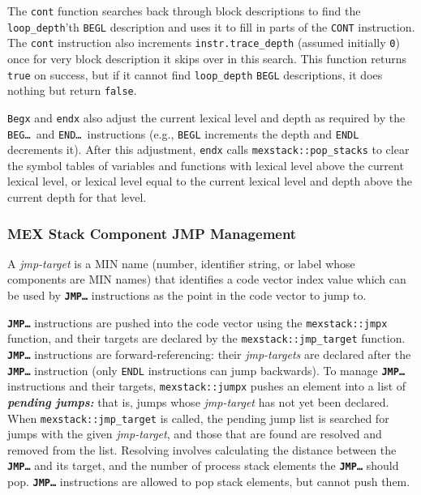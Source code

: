 \documentclass[12pt]{article}
\newcommand{\TT}[1]{{\tt \bfseries #1}}
\newcommand{\skey}[2]{{\bf \em #1#2}\index{#1}}
\newenvironment{indpar}[1][0.3in]%
	{\begin{list}{}%
		     {\setlength{\itemsep}{0in}%
		      \setlength{\topsep}{0in}%
		      \setlength{\parsep}{1ex}%
		      \setlength{\labelwidth}{#1}%
		      \setlength{\leftmargin}{#1}%
		      \addtolength{\leftmargin}{\labelsep}}%
	 \item}%
	{\end{list}}
\begin{document}
\begin{indpar}
The {\tt cont} function searches back through block descriptions to find
the {\tt loop\_depth}'th {\tt BEGL} description and uses it
to fill in parts of the {\tt CONT} instruction.  The {\tt cont} instruction
also increments {\tt instr.trace\_depth} (assumed initially {\tt 0})
once for very block description
it skips over in this search.  This function returns {\tt true} on success,
but if it cannot find {\tt loop\_depth} {\tt BEGL} descriptions, it does
nothing but return {\tt false}.

{\tt Begx} and {\tt endx} also adjust the current lexical level and
depth as required by the {\tt BEG\ldots}~and {\tt END\ldots}~instructions
(e.g., {\tt BEGL} increments the depth and {\tt ENDL} decrements it).
After this adjustment, {\tt endx} calls {\tt mexstack::pop\_stacks}
to clear the symbol tables of variables and functions with
lexical level above the current lexical level, or lexical level
equal to the current lexical level and depth above the current depth
for that level.
\end{indpar}


\subsubsection{MEX Stack Component JMP Management}
\label{MEX-STACK-COMPONENT-JMP-MANAGEMENT}

A {\em jmp-target} is a MIN name (number, identifier string, or
label whose components are MIN names) that identifies
a code vector index value which can be used by \TT{JMP\ldots}
instructions as the point in the code vector to jump to.

\TT{JMP\ldots} instructions are pushed into the code vector
using the {\tt mexstack::jmpx} function, and their targets are
declared by the {\tt mexstack::jmp\_target} function.
\TT{JMP\ldots} instructions are forward-referencing: their
{\em jmp-targets} are declared after the \TT{JMP\ldots} instruction
(only {\tt ENDL} instructions can jump backwards).
To manage \TT{JMP\ldots} instructions and their targets,
{\tt mexstack::jumpx} pushes an element into a list of \skey{pending jumps}:
that is, jumps whose {\em jmp-target} has not yet been
declared.  When {\tt mexstack::jmp\_target} is called,
the pending jump list is searched for jumps with the given
{\em jmp-target},
and those that are found are resolved and removed from
the list.  Resolving involves calculating the distance
between the \TT{JMP\ldots} and its target, and the number of
process stack elements the \TT{JMP\ldots} should pop.
\TT{JMP\ldots} instructions
are allowed to pop stack elements, but cannot push them.
\end{document}
